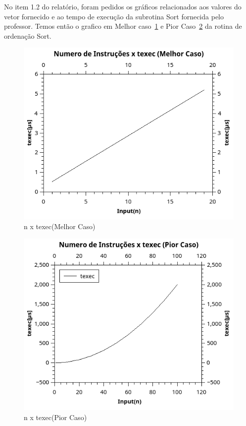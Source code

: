 \documentclass[12pt]{article}
\begin{document}
No item 1.2 do relatório, foram pedidos os gráficos relacionados aos valores do vetor fornecido e ao tempo de execução da subrotina Sort fornecida pelo professor. Temos então o grafico em Melhor caso~\ref{fig:txnMC} e Pior Caso~\ref{fig:txnPC} da rotina de ordenação Sort.

\begin{figure}[H]
	\centering
	\includegraphics[width=1\textwidth]{txnMC.png}
	\caption{n x texec(Melhor Caso)}
	\label{fig:txnMC}
\end{figure}

\begin{figure}[H]
	\centering
	\includegraphics[width=1\textwidth]{txnPC.png}
	\caption{n x texec(Pior Caso)}
	\label{fig:txnPC}
\end{figure}
\end{document}
